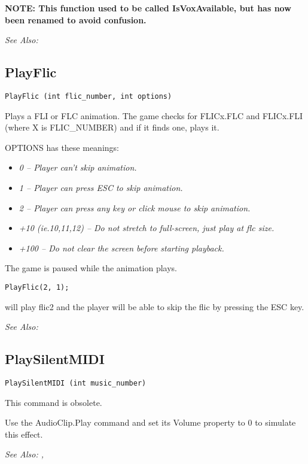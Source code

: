 \bf{NOTE:} This function used to be called IsVoxAvailable, but has now been renamed to avoid confusion.

\it{See Also:} 


\subsection{PlayFlic}\label{PlayFlic}%

\begin{verbatim}
PlayFlic (int flic_number, int options)
\end{verbatim}
Plays a FLI or FLC animation. The game checks for FLICx.FLC and FLICx.FLI
(where X is FLIC_NUMBER) and if it finds one, plays it.

OPTIONS has these meanings:
\begin{itemize}
\item \it{0} -- Player can't skip animation.
\item \it{1} -- Player can press ESC to skip animation.
\item \it{2} -- Player can press any key or click mouse to skip animation.
\item \it{+10 (ie.10,11,12)} -- Do not stretch to full-screen, just play at flc size.
\item \it{+100} -- Do not clear the screen before starting playback.
\end{itemize}
The game is paused while the animation plays.

\begin{verbatim}
PlayFlic(2, 1);
\end{verbatim}
will play flic2 and the player will be able to skip the flic by pressing the ESC key.

\it{See Also:} 


\subsection{PlaySilentMIDI}\label{PlaySilentMIDI}%

\begin{verbatim}
PlaySilentMIDI (int music_number)
\end{verbatim}
This command is obsolete.

Use the AudioClip.Play command and set its Volume property to 0 to simulate this effect.

\it{See Also:} , 


